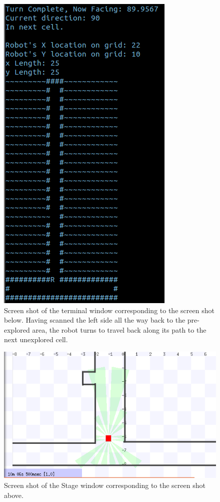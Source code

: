 \documentclass[a4paper,12pt]{article}
\begin{document}
\begin{figure}[H]
\includegraphics[scale=1.0]{RunT4.png}
\caption{Screen shot of the terminal window corresponding to the screen shot below. Having scanned the left side all the way back to the pre-explored area, the robot turns to travel back along its path to the next unexplored cell.}
\end{figure}

\begin{figure}[H]
\includegraphics[scale=0.9]{RunS4.png}
\caption{Screen shot of the Stage window corresponding to the screen shot above.}
\end{figure}
\end{document}
